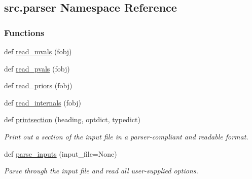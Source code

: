 \hypertarget{namespacesrc_1_1parser}{}\subsection{src.\+parser Namespace Reference}
\label{namespacesrc_1_1parser}
\subsubsection*{Functions}
\begin{DoxyCompactItemize}
\item 
def \hyperlink{namespacesrc_1_1parser_aced2c9dd0d97e164410aa12d7f69b829}{read\+\_\+mvals} (fobj)
\item 
def \hyperlink{namespacesrc_1_1parser_a93628f20ba0ae19f3efa460ea7f3e730}{read\+\_\+pvals} (fobj)
\item 
def \hyperlink{namespacesrc_1_1parser_a495dddc31f547cfe3d66134ffeb1bd90}{read\+\_\+priors} (fobj)
\item 
def \hyperlink{namespacesrc_1_1parser_abb7e103f77bb3de5a9019b2dd9680b5c}{read\+\_\+internals} (fobj)
\item 
def \hyperlink{namespacesrc_1_1parser_a070e27d6697698ee71f789283d019d52}{printsection} (heading, optdict, typedict)
\begin{DoxyCompactList}\small\item\em Print out a section of the input file in a parser-\/compliant and readable format. \end{DoxyCompactList}\item 
def \hyperlink{namespacesrc_1_1parser_a0931939fda05a56904977f2b4e1394d2}{parse\+\_\+inputs} (input\+\_\+file=None)
\begin{DoxyCompactList}\small\item\em Parse through the input file and read all user-\/supplied options. \end{DoxyCompactList}\end{DoxyCompactItemize}
